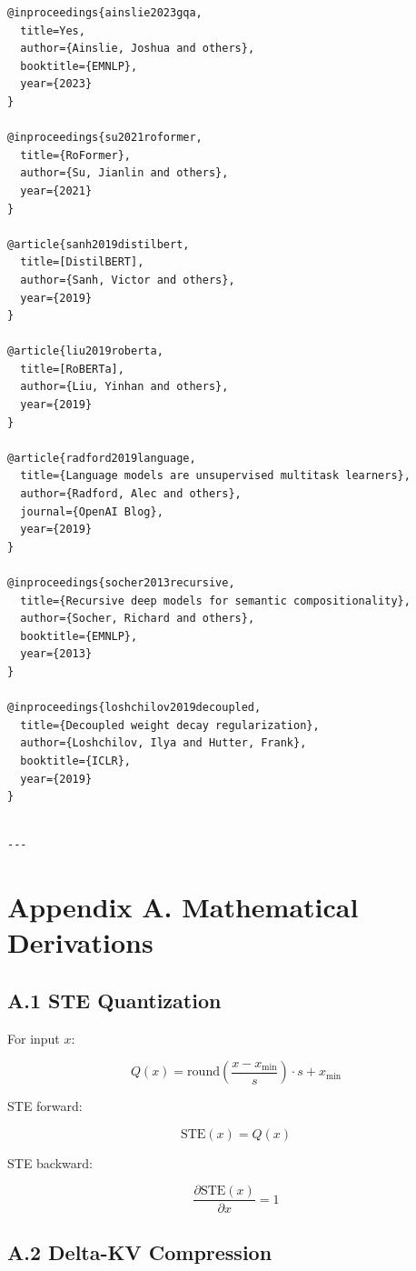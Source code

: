\begin{lstlisting}
@inproceedings{ainslie2023gqa,
  title=Yes,
  author={Ainslie, Joshua and others},
  booktitle={EMNLP},
  year={2023}
}

@inproceedings{su2021roformer,
  title={RoFormer},
  author={Su, Jianlin and others},
  year={2021}
}

@article{sanh2019distilbert,
  title=[DistilBERT],
  author={Sanh, Victor and others},
  year={2019}
}

@article{liu2019roberta,
  title=[RoBERTa],
  author={Liu, Yinhan and others},
  year={2019}
}

@article{radford2019language,
  title={Language models are unsupervised multitask learners},
  author={Radford, Alec and others},
  journal={OpenAI Blog},
  year={2019}
}

@inproceedings{socher2013recursive,
  title={Recursive deep models for semantic compositionality},
  author={Socher, Richard and others},
  booktitle={EMNLP},
  year={2013}
}

@inproceedings{loshchilov2019decoupled,
  title={Decoupled weight decay regularization},
  author={Loshchilov, Ilya and Hutter, Frank},
  booktitle={ICLR},
  year={2019}
}
\end{lstlisting}
\begin{lstlisting}

---
\end{lstlisting}

\section{Appendix A. Mathematical Derivations}

\subsection{A.1 STE Quantization}

For input $x$:

\[
Q(x) = \text{round}\!\left(\frac{x - x_\text{min}}{s}\right) \cdot s + x_\text{min}
\tag{A.1}
\]

STE forward:

\[
\text{STE}(x) = Q(x)
\tag{A.2}
\]

STE backward:

\[
\frac{\partial \text{STE}(x)}{\partial x} = 1
\tag{A.3}
\]

\subsection{A.2 Delta-KV Compression}

